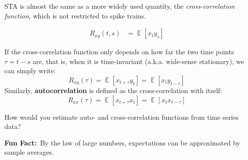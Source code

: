 \documentclass[a4paper,11pt]{exam}
\DeclareMathOperator*{\E}{\mathbb{E}} %
\DeclareMathOperator*{\var}{var}
\DeclareMathOperator*{\cov}{cov}
\newcommand{\funfact}{\textbf{Fun Fact:}~}
\begin{document}
\begin{questions}
\newpage
STA is almost the same as a more widely used quantity, the \emph{cross-correlation function}, which is not restricted to spike trains.
\begin{tcolorbox}[colback=red!5!white,colframe=red!50!black]
\begin{align}
    R_{xy}(t,s) &= \E[x_{t}y_s]
\end{align}
\end{tcolorbox}
If the cross-correlation function only depends on how far the two time points $\tau = t-s$ are, that is, when it is time-invariant (a.k.a. wide-sense stationary), we can simply write:
\begin{equation}
    R_{xy}(\tau) = \E[x_{t+\tau}y_t] = \E[x_t y_{t-\tau}]
\end{equation}
Similarly, \textbf{autocorrelation} is defined as the cross-correlation with itself:
\begin{equation}
    R_{xx}(\tau) = \E[x_{t+\tau}x_t] = \E[x_t x_{t-\tau}]
\end{equation}

\question How would you estimate auto- and cross-correlation functions from time series data?
\begin{tcolorbox}
    \funfact By the law of large numbers, expectations can be approximated by sample averages.
\end{tcolorbox}
\end{questions}
\end{document}
